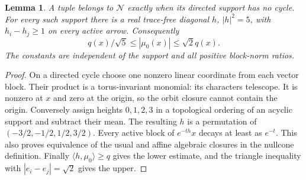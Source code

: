 \documentclass[11pt]{amsart}
\newtheorem{lemma}[theorem]{Lemma}
\theoremstyle{definition}
\theoremstyle{remark}
\begin{document}
\begin{lemma}\label{lem:nullcone}
A tuple belongs to $\mathcal N$ exactly when its directed support
has no cycle. For every such support there is a real trace-free
diagonal $h$, $|h|^2=5$, with $h_i-h_j\ge1$ on every active
arrow. Consequently
\begin{equation}\label{eq:height}
 q(x)/\sqrt5\le|\mu_0(x)|\le\sqrt2q(x).
\end{equation}
The constants are independent of the support and all positive
block-norm ratios.
\end{lemma}
\begin{proof}
On a directed cycle choose one nonzero linear coordinate from
each vector block. Their product is a torus-invariant monomial:
its characters telescope. It is nonzero at $x$ and zero at
the origin, so the orbit closure cannot contain the origin.
Conversely assign heights $0,1,2,3$ in a topological ordering
of an acyclic support and subtract their mean. The resulting
$h$ is a permutation of $(-3/2,-1/2,1/2,3/2)$.
Every active block of $e^{-th}x$ decays at least as $e^{-t}$.
This also proves equivalence of the usual and affine algebraic
closures in the nullcone definition. Finally
$\langle h,\mu_0\rangle\ge q$ gives the lower estimate, and
the triangle inequality with $|e_i-e_j|=\sqrt2$ gives the upper.
\end{proof}
\end{document}
